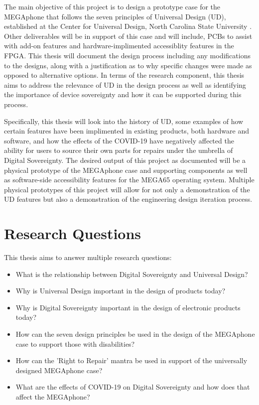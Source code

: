 The main objective of this project is to design a prototype case for the MEGAphone that follows the seven principles of Universal Design (UD), established at the Center for Universal Design, North Carolina State University \cite{sevenprinciples}. 
Other deliverables will be in support of this case and will include, PCBs to assist with add-on features and hardware-implimented accessiblity features in the FPGA.
This thesis will document the design process including any modifications to the designs, along with a justification as to why specific changes were made as opposed to alternative options.
In terms of the research component, this thesis aims to address the relevance of UD in the design process as well as identifying the importance of device sovereignty and how it can be supported during this process.

Specifically, this thesis will look into the history of UD, some examples of how certain features have been implimented in existing products, both hardware and software, and how the effects of the COVID-19 have negatively affected the ability for users to source their own parts for repairs under the umbrella of Digital Sovereignty.
The desired output of this project as documented will be a physical prototype of the MEGAphone case and supporting components as well as software-side accessibility features for the MEGA65 operating system.
Multiple physical prototypes of this project will allow for not only a demonstration of the UD features but also a demonstration of the engineering design iteration process.
 

\section{Research Questions}

This thesis aims to answer multiple research questions:

\begin{itemize} 
    \item What is the relationship between Digital Sovereignty and Universal Design?
    \item Why is Universal Design important in the design of products today?
    \item Why is Digital Sovereignty important in the design of electronic products today?
    \item How can the seven design principles be used in the design of the MEGAphone case to support those with disabilities?
    \item How can the 'Right to Repair' mantra be used in support of the universally designed MEGAphone case?
    \item What are the effects of COVID-19 on Digital Sovereignty and how does that affect the MEGAphone? %
\end{itemize}

